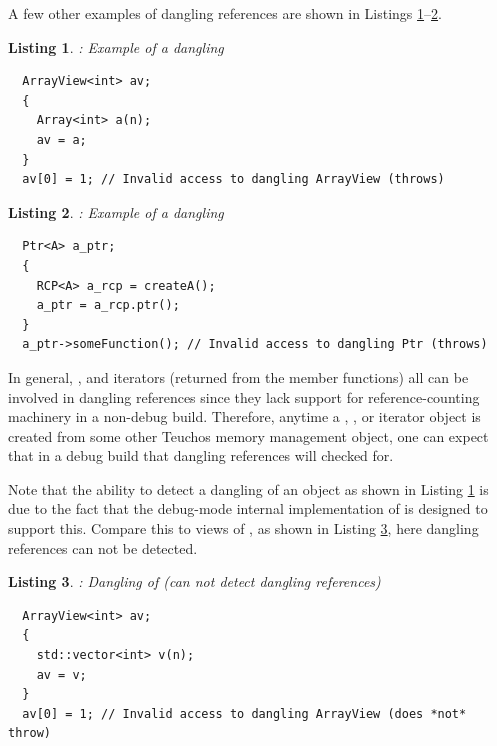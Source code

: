 \documentclass[pdf,ps2pdf,11pt]{SANDreport}
\newtheorem{listing}{Listing}
\begin{document}
A few other examples of dangling references are shown in Listings
{}\ref{listing:Array-dangling-ArrayView}--{}\ref{listing:RCP-dangling-Ptr}.

\begin{listing}: Example of a dangling {} \\
\label{listing:Array-dangling-ArrayView}
{\small\begin{verbatim}
  ArrayView<int> av;
  {
    Array<int> a(n);
    av = a;
  }
  av[0] = 1; // Invalid access to dangling ArrayView (throws)
\end{verbatim}}
\end{listing}

\begin{listing}: Example of a dangling {} \\
\label{listing:RCP-dangling-Ptr}
{\small\begin{verbatim}
  Ptr<A> a_ptr;
  {
    RCP<A> a_rcp = createA();
    a_ptr = a_rcp.ptr();
  }
  a_ptr->someFunction(); // Invalid access to dangling Ptr (throws)
\end{verbatim}}
\end{listing}

In general, {}, {} and iterators (returned
from the {} member functions) all can be involved in
dangling references since they lack support for reference-counting
machinery in a non-debug build.  Therefore, anytime a {},
{}, or iterator object is created from some other
Teuchos memory management object, one can expect that in a debug build
that dangling references will checked for.

Note that the ability to detect a dangling {} of an
{} object as shown in Listing
{}\ref{listing:Array-dangling-ArrayView} is due to the fact that the
debug-mode internal implementation of {} is designed to
support this.  Compare this to {} views of
{}, as shown in Listing
{}\ref{listing:vector-dangling-ArrayView}, here dangling references
can not be detected.

\begin{listing}: Dangling {} of {}
(can not detect dangling references) \\
\label{listing:vector-dangling-ArrayView}
{\small\begin{verbatim}
  ArrayView<int> av;
  {
    std::vector<int> v(n);
    av = v;
  }
  av[0] = 1; // Invalid access to dangling ArrayView (does *not* throw)
\end{verbatim}}
\end{listing}
\end{document}

